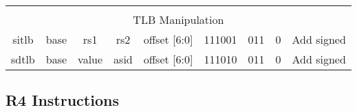 \documentclass{article}
\begin{document}
\begin{center}
\begin{longtable}{|c|l|r|l|r|l|r|l|r|l|r|l|r|c|c|}
    
    \hline          \multicolumn{15}{|c|}{} \\
    
                    \multicolumn{15}{|c|}{TLB Manipulation} \\  
    \hline sitlb &  \multicolumn{2}{|c|}{base}          &   \multicolumn{2}{|c|}{rs1}       &   \multicolumn{2}{|c|}{rs2}       &   \multicolumn{2}{|c|}{offset [6:0]}      &   \multicolumn{2}{|c|}{111001}    &   \multicolumn{2}{|c|}{011}       &   0       &   Add signed \\
    \hline sdtlb &  \multicolumn{2}{|c|}{base}          &   \multicolumn{2}{|c|}{value}     &   \multicolumn{2}{|c|}{asid}      &   \multicolumn{2}{|c|}{offset [6:0]}      &   \multicolumn{2}{|c|}{111010}    &   \multicolumn{2}{|c|}{011}       &   0       &   Add signed \\
    
    
    \hline
    \end{longtable}
    \end{center}
    
    
    \subsection{R4 Instructions}
    
\end{document}
